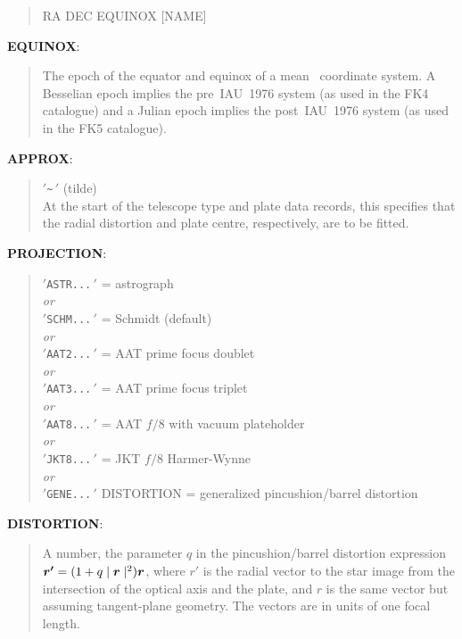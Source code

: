 \begin{quote}
 RA DEC EQUINOX [NAME]
\end{quote}

\goodbreak
{\bf EQUINOX}:

\begin{quote}
The epoch of the equator and equinox of a mean \radec\
coordinate system.  A Besselian epoch implies the pre~IAU~1976
system (as used in the FK4 catalogue) and a Julian epoch implies
the post~IAU~1976 system (as used in the FK5 catalogue).
\end{quote}

\goodbreak
{\bf APPROX}:

\begin{quote}
 $'$\verb|~|$\,'$ (tilde) \\
At the start of the telescope type and plate data
records, this specifies that the radial
distortion and plate centre, respectively, are to be fitted.
\end{quote}

\goodbreak
{\bf PROJECTION}:

\begin{quote}
 $'$\verb|ASTR...|$\,'$ = astrograph \\
 {\it or} \\
 $'$\verb|SCHM...|$\,'$ = Schmidt (default) \\
 {\it or} \\
 $'$\verb|AAT2...|$\,'$ = AAT prime focus doublet \\
 {\it or} \\
 $'$\verb|AAT3...|$\,'$ = AAT prime focus triplet \\
 {\it or} \\
 $'$\verb|AAT8...|$\,'$ = AAT $f/8$ with vacuum plateholder \\
 {\it or} \\
 $'$\verb|JKT8...|$\,'$ = JKT $f/8$ Harmer-Wynne \\
 {\it or} \\
 $'$\verb|GENE...|$\,'$ DISTORTION = generalized pincushion/barrel distortion
\end{quote}

\goodbreak
{\bf DISTORTION}:

\begin{quote}
A number, the parameter $q$ in the pincushion/barrel
distortion expression
$\mbox{\boldmath $r'$}=(1+q\mid\mbox{\boldmath $r$}\mid^2)\mbox{\boldmath $r$}$,
where \mbox{\boldmath $r'$} is the radial vector to the star image
from the intersection of the optical axis and the plate,
and \mbox{\boldmath $r$} is the same vector but assuming tangent-plane
geometry.
The vectors are in units of one focal length.
\end{quote}

